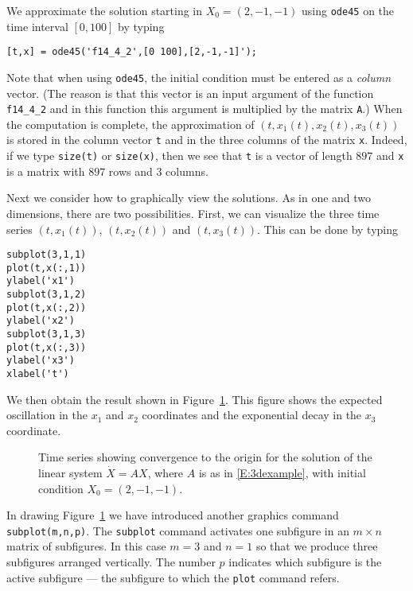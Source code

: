 \documentclass{ximera}
\begin{document}
We approximate the solution starting in $X_0=(2,-1,-1)$ using
{\tt ode45} on the time interval $[0,100]$ by typing
\begin{verbatim}
[t,x] = ode45('f14_4_2',[0 100],[2,-1,-1]');
\end{verbatim}
Note that when using {\tt ode45}, the 
initial condition must be entered 
as a {\em column\/} vector.   (The reason is that this vector is an
input argument of the function {\tt f14\_4\_2} and in this function
this argument is multiplied by the matrix {\tt A}.)  When the computation 
is complete, 
the approximation of $(t,x_1(t),x_2(t),x_3(t))$ is stored in the column 
vector {\tt t} and in the three columns of the matrix {\tt x}.  Indeed, if 
we type {\tt size(t)} or {\tt size(x)}, then we see that {\tt t} is a 
vector of length $897$ and {\tt x} is a matrix with $897$ rows and $3$ 
columns.  

Next we consider how to graphically view the solutions.  As in one and
two dimensions, there are two possibilities.  First, we can visualize 
the three time series 
$(t,x_1(t))$, $(t,x_2(t))$ and $(t,x_3(t))$.  
This can be done by typing
\begin{verbatim}
subplot(3,1,1)
plot(t,x(:,1))
ylabel('x1')
subplot(3,1,2)
plot(t,x(:,2))
ylabel('x2')
subplot(3,1,3)
plot(t,x(:,3))
ylabel('x3')
xlabel('t')
\end{verbatim}
We then obtain the result shown in Figure~\ref{fig:flinear1}.  This figure 
shows the expected oscillation in the $x_1$ and $x_2$ coordinates and the 
exponential decay in the $x_3$ coordinate.
\begin{figure}[htb]
   \centerline{%
   }
   \caption{Time series showing convergence to the origin for the solution 
	of the linear system $\dot X=AX$, where $A$ is as in 
	\protect\eqref{E:3dexample}, with initial condition $X_0=(2,-1,-1)$.}
   \label{fig:flinear1}
\end{figure}

In drawing Figure~\ref{fig:flinear1} we have introduced another \Matlab 
graphics command {\tt subplot(m,n,p)}.  
The {\tt subplot} command activates one 
subfigure in an $m\times n$ matrix of subfigures.  In this case $m=3$ 
and $n=1$ so that we produce three subfigures arranged vertically.  
The number $p$ indicates which subfigure is the active subfigure --- the 
subfigure to which the {\tt plot} command refers.
\end{document}
